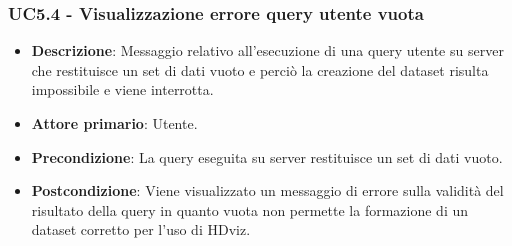 \subsubsection{UC5.4 - Visualizzazione errore query utente vuota}
\label{subsec:uc5.1.2}
\begin{itemize}
    \item \textbf{Descrizione}: Messaggio relativo all'esecuzione di una query utente su server che restituisce 
                                un set di dati vuoto e
                                perciò la creazione del dataset risulta impossibile e viene interrotta.

    \item \textbf{Attore primario}: Utente.
    
    \item \textbf{Precondizione}:   La query eseguita su server restituisce un set di dati vuoto.

    \item \textbf{Postcondizione}:   Viene visualizzato un messaggio di errore sulla validità del risultato della query 
                                        in quanto vuota non permette la formazione di un dataset corretto per l'uso di HDviz.


\end{itemize}